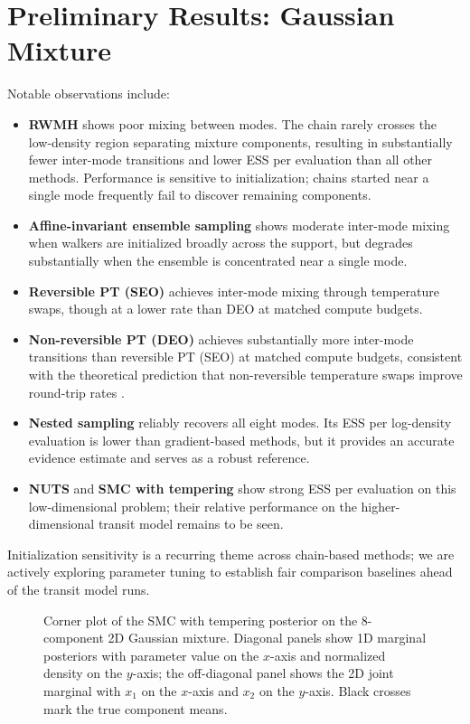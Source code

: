 \documentclass{article}
\begin{document}
\section{Preliminary Results: Gaussian Mixture}

Notable observations include:

\begin{itemize}
  \item \textbf{RWMH} shows poor mixing between modes. The chain rarely crosses
    the low-density region separating mixture components, resulting in
    substantially fewer inter-mode transitions and lower ESS per evaluation than
    all other methods. Performance is sensitive to initialization; chains started
    near a single mode frequently fail to discover remaining components.
  \item \textbf{Affine-invariant ensemble sampling} shows moderate inter-mode
    mixing when walkers are initialized broadly across the support, but degrades
    substantially when the ensemble is concentrated near a single mode.
  \item \textbf{Reversible PT (SEO)} achieves inter-mode mixing through
    temperature swaps, though at a lower rate than DEO at matched compute budgets.
  \item \textbf{Non-reversible PT (DEO)} achieves substantially more inter-mode
    transitions than reversible PT (SEO) at matched compute budgets, consistent
    with the theoretical prediction that non-reversible temperature swaps improve
    round-trip rates \cite{syed2019}.
  \item \textbf{Nested sampling} reliably recovers all eight modes. Its ESS per
    log-density evaluation is lower than gradient-based methods, but it provides
    an accurate evidence estimate and serves as a robust reference.
  \item \textbf{NUTS} and \textbf{SMC with tempering} show strong ESS per
    evaluation on this low-dimensional problem; their relative performance on the
    higher-dimensional transit model remains to be seen.
\end{itemize}
Initialization sensitivity is a recurring theme across chain-based methods; we
are actively exploring parameter tuning to establish fair comparison baselines
ahead of the transit model runs.

\begin{figure}[h]
\centering
{}
\caption{Corner plot of the SMC with tempering posterior on the 8-component 2D Gaussian
  mixture. Diagonal panels show 1D marginal posteriors with parameter value on the
  $x$-axis and normalized density on the $y$-axis; the off-diagonal panel shows the 2D
  joint marginal with $x_1$ on the $x$-axis and $x_2$ on the $y$-axis. Black crosses
  mark the true component means.}
\label{fig:smc-corner}
\end{figure}
\end{document}
